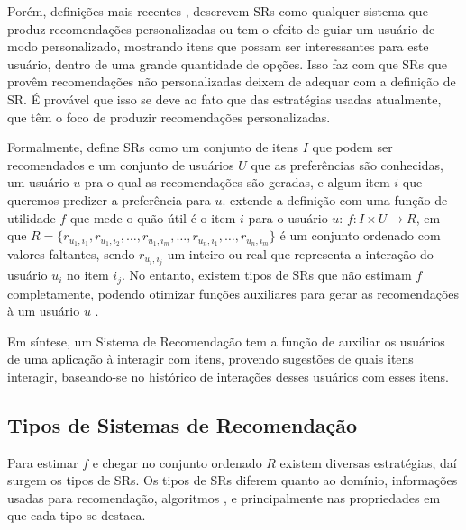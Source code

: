 \documentclass[normaltoc, espacoumemeio, pnumromarab,ruledheader]{abnt}
\begin{document}
Porém, definições mais recentes \cite{Burke2002,Burke2007}, descrevem SRs como qualquer sistema que produz recomendações personalizadas ou tem o efeito de guiar um usuário de modo personalizado, mostrando itens que possam ser interessantes para este usuário, dentro de uma grande quantidade de opções.
Isso faz com que SRs que provêm recomendações não personalizadas deixem de adequar com a definição de SR.
É provável que isso se deve ao fato que das estratégias usadas atualmente, que têm o foco de produzir recomendações personalizadas.

Formalmente,  define SRs como um conjunto de itens $I$  que podem ser recomendados e um conjunto de usuários $U$ que as preferências são conhecidas, um usuário $u$ pra o qual as recomendações são geradas, e algum item $i$ que queremos predizer a preferência para $u$.
 extende a definição com uma função de utilidade $f$ que mede o quão útil é o item $i$ para o usuário $u$: $f: I \times U \rightarrow R$, em que $R = \{ r_{u_1,i_1}, r_{u_1,i_2}, \dots, r_{u_1,i_m}, \dots, r_{u_n,i_1}, \dots, r_{u_n,i_m} \}$ é um conjunto ordenado com valores faltantes, sendo $r_{u_i,i_j}$ um inteiro ou real que representa a interação do usuário $u_i$ no item $i_j$.
No entanto, existem tipos de SRs que não estimam $f$ completamente, podendo otimizar funções auxiliares para gerar as recomendações à um usuário $u$ \cite{Lops2011}.

Em síntese, um Sistema de Recomendação tem a função de auxiliar os usuários de uma aplicação à interagir com itens, provendo sugestões de quais itens interagir, baseando-se no histórico de interações desses usuários com esses itens.

 \subsection{Tipos de Sistemas de Recomendação}
 \label{subsec:tipossr}

Para estimar $f$ e chegar no conjunto ordenado $R$ existem diversas estratégias, daí surgem os tipos de SRs.
Os tipos de SRs diferem quanto ao domínio, informações usadas para recomendação, algoritmos \cite{Feldman2006}, e principalmente nas propriedades em que cada tipo se destaca.
\end{document}
